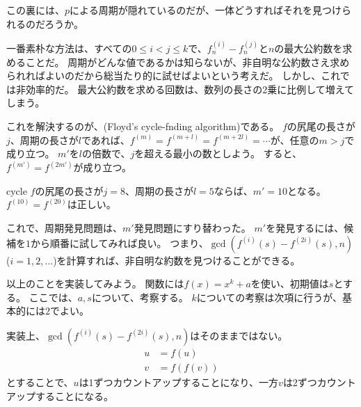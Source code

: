 この裏には、$p$による周期が隠れているのだが、一体どうすればそれを見つけられるのだろうか。

一番素朴な方法は、すべての$0\le{i}<j\le{k}$で、$f_n^{(i)}-f_n^{(j)}$と$n$の最大公約数を求めることだ。
周期がどんな値であるかは知らないが、非自明な公約数さえ求められればよいのだから総当たり的に試せばよいという考えだ。
しかし、これでは非効率的だ。
最大公約数を求める回数は、数列の長さの2乗に比例して増えてしまう。

これを解決するのが、(Floyd's cycle-fnding algorithm)\cite{Floyd:1967:NA:321420.321422}である。
$f$の尻尾の長さが$j$、周期の長さが$l$であれば、$f^{(m)}=f^{(m+l)}=f^{(m+2l)}=\cdots$が、任意の$m>{j}$で成り立つ。
$m'$を$l$の倍数で、$j$を超える最小の数としよう。
すると、$f^{(m')}=f^{(2m')}$が成り立つ。

\begin{Exam}{}{cycle}
$f$の尻尾の長さが$j = 8$、周期の長さが$l = 5$ならば、$m' = 10$となる。$f^{(10)}=f^{(20)}$は正しい。
\end{Exam}

これで、周期発見問題は、$m'$発見問題にすり替わった。
$m'$を発見するには、候補を$1$から順番に試してみれば良い。
つまり、$\gcd(f^{(i)}(s) - f^{(2i)}(s), n)$ ($i=1,2,\ldots$)を計算すれば、非自明な約数を見つけることができる。

以上のことを実装してみよう。
関数には$f(x)=x^k+a$を使い、初期値は$s$とする。
ここでは、$a, s$について、考察する。
$k$についての考察は次項に行うが、基本的には$2$でよい。

実装上、$\gcd(f^{(i)}(s) - f^{(2i)}(s), n)$はそのままではない。
\begin{align*}
u &= f(u)\\
v &= f(f(v))
\end{align*}
とすることで、$u$は1ずつカウントアップすることになり、一方$v$は2ずつカウントアップすることになる。


